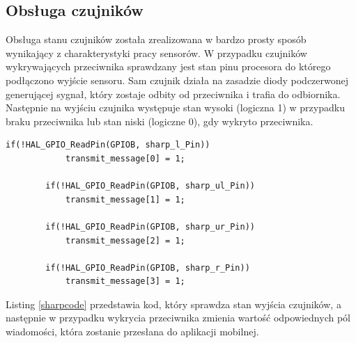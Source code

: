 \subsection{Obsługa czujników}
Obsługa stanu czujników została zrealizowana w bardzo prosty sposób wynikający z charakterystyki pracy sensorów. W przypadku czujników wykrywających przeciwnika sprawdzany jest stan pinu procesora do którego podłączono wyjście sensoru. Sam czujnik działa na zasadzie diody podczerwonej generującej sygnał, który zostaje odbity od przeciwnika i trafia do odbiornika. Następnie na wyjściu czujnika występuje stan wysoki (logiczna 1) w przypadku braku przeciwnika lub stan niski (logiczne 0), gdy wykryto przeciwnika.

\begin{minipage}{\textwidth}
	\begin{lstlisting}[label=sharpcode,caption=Obsługa czujników przeciwnika.]
if(!HAL_GPIO_ReadPin(GPIOB, sharp_l_Pin))
  			transmit_message[0] = 1;

  		if(!HAL_GPIO_ReadPin(GPIOB, sharp_ul_Pin))
  			transmit_message[1] = 1;

  		if(!HAL_GPIO_ReadPin(GPIOB, sharp_ur_Pin))
  			transmit_message[2] = 1;

  		if(!HAL_GPIO_ReadPin(GPIOB, sharp_r_Pin))
  			transmit_message[3] = 1;
	\end{lstlisting}
\end{minipage}

Listing \ref{sharpcode} przedstawia kod, który sprawdza stan wyjścia czujników, a następnie w przypadku wykrycia przeciwnika zmienia wartość odpowiednych pól wiadomości, która zostanie przesłana do aplikacji mobilnej. 